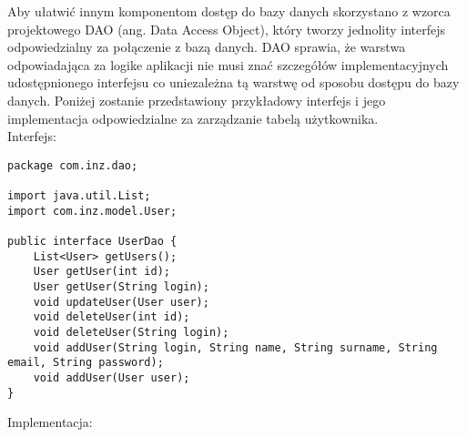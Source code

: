 Aby ułatwić innym komponentom dostęp do bazy danych skorzystano z wzorca projektowego DAO (ang. Data Access Object), który tworzy jednolity interfejs odpowiedzialny za połączenie z bazą danych. DAO sprawia, że warstwa odpowiadająca za logike aplikacji nie musi znać szczegółów implementacyjnych udostępnionego interfejsu co uniezależna tą warstwę od sposobu dostępu do bazy danych. Poniżej zostanie przedstawiony przykładowy interfejs i jego implementacja odpowiedzialne za zarządzanie tabelą użytkownika.\\
Interfejs:
\begin{lstlisting}[breaklines=true]
package com.inz.dao;

import java.util.List;
import com.inz.model.User;

public interface UserDao {
	List<User> getUsers();
	User getUser(int id);
	User getUser(String login);
	void updateUser(User user);
	void deleteUser(int id);
	void deleteUser(String login);
	void addUser(String login, String name, String surname, String email, String password);
	void addUser(User user);
}
\end{lstlisting}
Implementacja:
